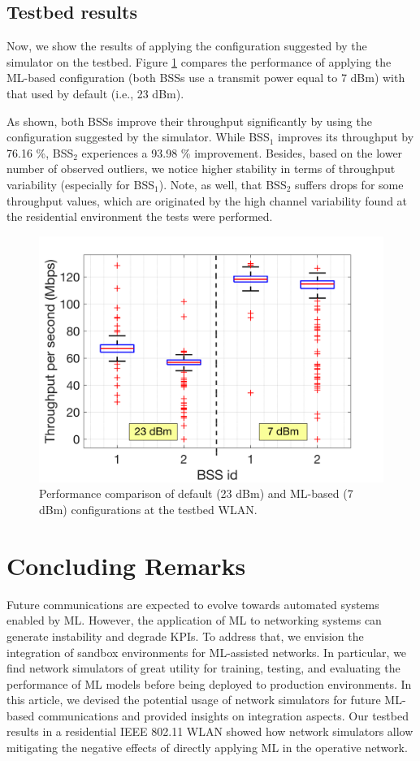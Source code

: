 \documentclass[journal]{IEEEtran}
\begin{document}
	\subsection{Testbed results}
	Now, we show the results of applying the configuration suggested by the simulator on the testbed. Figure \ref{fig:results} compares the performance of applying the ML-based configuration (both BSSs use a transmit power equal to 7 dBm) with that used by default (i.e., 23 dBm).
	
	As shown, both BSSs improve their throughput significantly by using the configuration suggested by the simulator. While BSS$_1$ improves its throughput by 76.16 \%, BSS$_2$ experiences a 93.98 \% improvement. Besides, based on the lower number of observed outliers, we notice higher stability in terms of throughput variability (especially for BSS$_1$). Note, as well, that BSS$_2$ suffers drops for some throughput values, which are originated by the high channel variability found at the residential environment the tests were performed.
	\begin{figure}[ht!!!!]
		\centering
		\includegraphics[width=0.8\columnwidth]{boxplotbps.png}
		\caption{Performance comparison of default (23 dBm) and ML-based (7 dBm) configurations at the testbed WLAN.}
		\label{fig:results}
	\end{figure}
	
	\section{Concluding Remarks}
	Future communications are expected to evolve towards automated systems enabled by ML. However, the application of ML to networking systems can generate instability and degrade KPIs. To address that, we envision the integration of sandbox environments for ML-assisted networks. In particular, we find network simulators of great utility for training, testing, and evaluating the performance of ML models before being deployed to production environments. In this article, we devised the potential usage of network simulators for future ML-based communications and provided insights on integration aspects. Our testbed results in a residential IEEE 802.11 WLAN showed how network simulators allow mitigating the negative effects of directly applying ML in the operative network.
	
\end{document}
